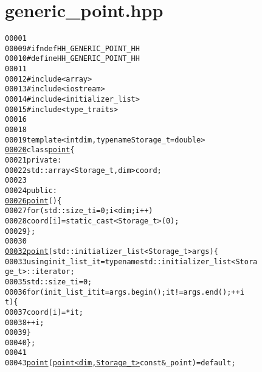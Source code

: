 \hypertarget{generic__point_8hpp_source}{
\section{generic\_\-point.hpp}
}


\begin{footnotesize}\begin{alltt}
00001 
00009 \textcolor{preprocessor}{#ifndef HH\_GENERIC\_POINT\_HH}
00010 \textcolor{preprocessor}{}\textcolor{preprocessor}{#define HH\_GENERIC\_POINT\_HH}
00011 \textcolor{preprocessor}{}
00012 \textcolor{preprocessor}{#include<array>}
00013 \textcolor{preprocessor}{#include<iostream>}
00014 \textcolor{preprocessor}{#include<initializer\_list>}
00015 \textcolor{preprocessor}{#include<type\_traits>}
00016 
00018 
00019 \textcolor{keyword}{template} <\textcolor{keywordtype}{int} dim, \textcolor{keyword}{typename} Storage\_t = \textcolor{keywordtype}{double}>
\hypertarget{generic__point_8hpp_source_l00020}{}\hyperlink{classpoint}{00020} \textcolor{keyword}{class }\hyperlink{classpoint}{point} \{
00021         \textcolor{keyword}{private}:
00022                 std::array<Storage\_t, dim> coord;
00023         
00024         \textcolor{keyword}{public}:
\hypertarget{generic__point_8hpp_source_l00026}{}\hyperlink{classpoint_a6760c0eaac9d6b3d1d1591f942d389c0}{00026}                 \hyperlink{classpoint_a6760c0eaac9d6b3d1d1591f942d389c0}{point}()\{
00027                         \textcolor{keywordflow}{for}(std::size\_t i = 0; i < dim; i++)
00028                                 coord[i] = static\_cast<Storage\_t>(0);
00029                 \};
00030                 
\hypertarget{generic__point_8hpp_source_l00032}{}\hyperlink{classpoint_a0fb87b56e4911071c175143175d8750e}{00032}                 \hyperlink{classpoint_a0fb87b56e4911071c175143175d8750e}{point}(std::initializer\_list<Storage\_t> args)\{
00033                         \textcolor{keyword}{using} init\_list\_it = \textcolor{keyword}{typename} std::initializer\_list<Stora
      ge\_t>::iterator;
00035                         std::size\_t i = 0;
00036                         \textcolor{keywordflow}{for}(init\_list\_it it = args.begin(); it != args.end(); ++i
      t)\{
00037                                 coord[i] = *it;
00038                                 ++i;
00039                         \}
00040                 \};
00041                 
00043                 \hyperlink{classpoint_a6760c0eaac9d6b3d1d1591f942d389c0}{point}(\hyperlink{classpoint}{point<dim, Storage_t>} \textcolor{keyword}{const}& \_point) = \textcolor{keywordflow}{default};

\end{alltt}
\end{footnotesize}
